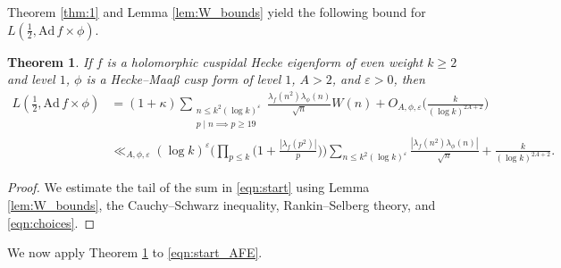 \documentclass[12pt,reqno]{amsart}
\newtheorem{thm}{Theorem}[section]
\theoremstyle{remark}
\numberwithin{equation}{section}
\begin{document}
Theorem \ref{thm:1} and Lemma \ref{lem:W_bounds} yield the following bound for $L(\frac{1}{2},\mathrm{Ad}\,f\times\phi)$.
\begin{thm}
\label{thm:AFE}
If $f$ is a holomorphic cuspidal Hecke eigenform of even weight $k\geq 2$ and level $1$, $\phi$ is a Hecke--Maa{\ss} cusp form of level $1$, $A>2$, and $\varepsilon>0$, then
\begin{align*}
L(\tfrac{1}{2},\mathrm{Ad}\,f\times\phi)&=(1+\kappa)\sum_{\substack{n\leq k^2(\log k)^{\varepsilon} \\ p\mid n\implies p\geq 19}}\frac{\lambda_{f}(n^2)\lambda_{\phi}(n)}{\sqrt{n}}W(n)+O_{A,\phi,\varepsilon}\Big(\frac{k}{(\log k)^{2A+2}}\Big)\\
&\ll_{A,\phi,\varepsilon}    (\log k)^{\varepsilon} \Big(\prod_{p \le k} \Big( 1+\frac{|\lambda_{f}(p^2)|}{p}\Big)\Big)\sum_{n\leq k^2(\log k)^{\varepsilon}}\frac{|\lambda_{f}(n^2)\lambda_{\phi}(n)|}{\sqrt{n}} +\frac{k}{(\log k)^{2A+2}}. 
\end{align*}
\end{thm}

\begin{proof}
We estimate the tail of the sum in \eqref{eqn:start} using Lemma \ref{lem:W_bounds}, the Cauchy--Schwarz inequality, Rankin--Selberg theory, and \eqref{eqn:choices}.
\end{proof}


We now apply Theorem \ref{thm:AFE} to \eqref{eqn:start_AFE}.
\end{document}
